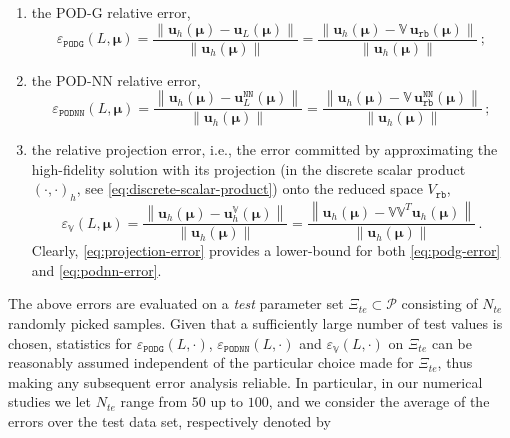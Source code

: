 \documentclass[longtitle]{elsarticle}
\numberwithin{equation}{section}
\theoremstyle{theorem}
\theoremstyle{definition}
\theoremstyle{remark}
\theoremstyle{proposition}
\numberwithin{figure}{section}
\newcommand{\norm}[1]{\left\lVert#1\right\rVert}
\newcommand{\bg}[1]{\boldsymbol{#1}}
\begin{document}
		\begin{enumerate}[label=(\alph*)]
			\item the POD-G relative error,
			\begin{equation}
				\label{eq:podg-error}
				\varepsilon_{\texttt{PODG}}^{}(L, \bg{\mu}) = \dfrac{\norm{\mathbf{u}_h(\bg{\mu}) - \mathbf{u}_L(\bg{\mu})}}{\norm{\mathbf{u}_h(\bg{\mu})}} = \dfrac{\norm{\mathbf{u}_h(\bg{\mu}) - \mathbb{V} \, \mathbf{u}_{\texttt{rb}}(\bg{\mu})}}{\norm{\mathbf{u}_h(\bg{\mu})}} \, ;
			\end{equation}
			\item the POD-NN relative error,
			\begin{equation}
				\label{eq:podnn-error}
				\varepsilon_{\texttt{PODNN}}^{}(L, \bg{\mu}) = \dfrac{\norm{\mathbf{u}_h(\bg{\mu}) - \mathbf{u}_L^{\texttt{NN}}(\bg{\mu})}}{\norm{\mathbf{u}_h(\bg{\mu})}} = \dfrac{\norm{\mathbf{u}_h(\bg{\mu}) - \mathbb{V} \, \mathbf{u}_{\texttt{rb}}^{\texttt{NN}}(\bg{\mu})}}{\norm{\mathbf{u}_h(\bg{\mu})}} \, ;
			\end{equation}
			\item the relative projection error, i.e., the error committed by approximating the high-fidelity solution with its projection (in the discrete scalar product $(\cdot,\cdot)_h$, see \eqref{eq:discrete-scalar-product}) onto the reduced space $V_{\texttt{rb}}$,
			\begin{equation}
				\label{eq:projection-error}
				\varepsilon_{\mathbb{V}}^{}(L, \bg{\mu}) = \dfrac{\norm{\mathbf{u}_h(\bg{\mu}) - \mathbf{u}_h^{\mathbb{V}}(\bg{\mu})}}{\norm{\mathbf{u}_h(\bg{\mu})}} = \dfrac{\norm{\mathbf{u}_h(\bg{\mu}) - \mathbb{V} \mathbb{V}^T \mathbf{u}_h(\bg{\mu})}}{\norm{\mathbf{u}_h(\bg{\mu})}} \, .
			\end{equation}
			Clearly, \eqref{eq:projection-error} provides a lower-bound for both \eqref{eq:podg-error} and \eqref{eq:podnn-error}.  
		\end{enumerate}
		The above errors are evaluated on a \emph{test} parameter set $\Xi_{te} \subset \mathcal{P}$ consisting of $N_{te}$ randomly picked samples. Given that a sufficiently large number of test values is chosen, statistics for $\varepsilon_{\texttt{PODG}}^{}(L, \cdot)$, $\varepsilon_{\texttt{PODNN}}^{}(L, \cdot)$ and $\varepsilon_{\mathbb{V}}^{}(L, \cdot)$ on $\Xi_{te}$ can be reasonably assumed independent of the particular choice made for $\Xi_{te}$, thus making any subsequent error analysis reliable. In particular, in our numerical studies we let $N_{te}$ range from $50$ up to $100$, and we consider the average of the errors over the test data set, respectively denoted by
\end{document}
